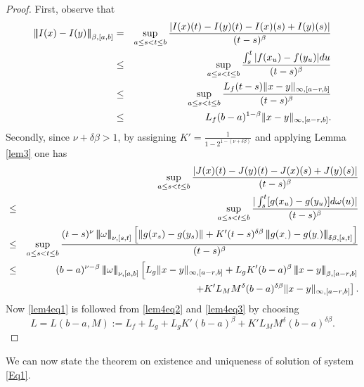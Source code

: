 \documentclass[graybox]{svmult}
\newcommand{\ltn}{\ensuremath{\left| \! \left| \! \left|}}
\newcommand{\rtn}{\ensuremath{\right| \! \right| \! \right|}}
\begin{document}
\begin{proof}
	First, observe that%
	\begin{eqnarray}\label{lem4eq2}
	\ltn I(x)-I(y)\rtn_{\beta,[a,b]}&=&
	\sup_{a\leq s<t\leq b}\frac{|I(x)(t)-I(y)(t)-I(x)(s)+I(y)(s)|}{(t-s)^\beta}\notag\\
	&\leq &\sup_{a\leq s<t\leq b}\frac{\int_s^t|f(x_u)-f(y_u)|du}{(t-s)^\beta}\notag\\
	&\leq& \sup_{a\leq s<t\leq b}\frac{L_f(t-s)\|x-y\|_{\infty,[a-r,b]}}{(t-s)^\beta}\notag\\
	&\leq& L_f(b-a)^{1-\beta}\|x-y\|_{\infty,[a-r,b]}.
	\end{eqnarray}
	Secondly, since $\nu+\delta\beta>1$, by assigning $K'=\frac{1}{1-2^{1-(\nu+\delta\beta)}}$ and applying Lemma \ref{lem3} one has
	\begin{eqnarray}\label{lem4eq3}
	&& \sup_{a\leq s<t\leq b}\frac{|J(x)(t)-J(y)(t)-J(x)(s)+J(y)(s)|}{(t-s)^\beta} \notag\\
	&\leq &\sup_{a\leq s<t\leq b}\frac{|\int_s^t[g(x_u)-g(y_u)]d\omega(u)|}{(t-s)^\beta}\notag\\
	&\leq& \sup_{a\leq s<t\leq b}\frac{(t-s)^{\nu}\ltn\omega\rtn_{\nu,[s,t]}\left[\|g(x_s)-g(y_s)\|+K'(t-s)^{\delta\beta}\ltn g(x_.)-g(y_.)\rtn_{\delta\beta,[s,t]}\right]}{(t-s)^\beta}\notag\\
	&\leq& (b-a)^{\nu-\beta}\ltn\omega\rtn_{\nu,[a,b]}  \left[ L_g\|x-y\|_{\infty,[a-r,b]}+L_gK'(b-a)^{\beta}\ltn x-y\rtn_{\beta,[a-r,b]}\right.\notag\\
	&&\qquad\qquad\qquad\qquad\qquad\qquad\qquad\left.+K'L_MM^{\delta}(b-a)^{\delta\beta}\|x-y\|_{\infty,[a-r,b]}\right].
	\end{eqnarray}
	Now \eqref{lem4eq1} is followed from \eqref{lem4eq2} and \eqref{lem4eq3} by choosing
	\begin{equation}\label{eqL}
	L = L(b-a,M) := L_f + L_g + L_g K' (b-a)^\beta +  K'L_M M^{\delta} (b-a)^{\delta\beta}.
	\end{equation}
\end{proof}

We can now state the theorem on existence and uniqueness of solution of system \eqref{Eq1}.

\end{document}
